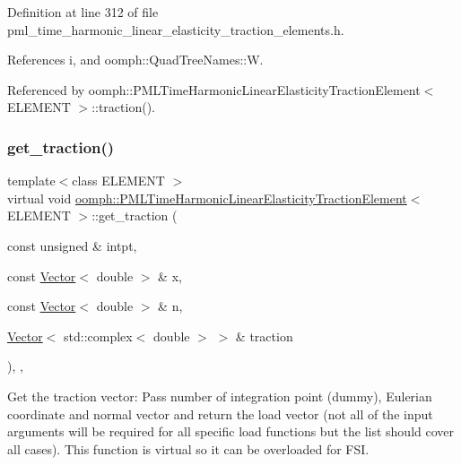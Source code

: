 Definition at line 312 of file pml\+\_\+time\+\_\+harmonic\+\_\+linear\+\_\+elasticity\+\_\+traction\+\_\+elements.\+h.



References i, and oomph\+::\+Quad\+Tree\+Names\+::W.



Referenced by oomph\+::\+P\+M\+L\+Time\+Harmonic\+Linear\+Elasticity\+Traction\+Element$<$ E\+L\+E\+M\+E\+N\+T $>$\+::traction().

\mbox{\label{classoomph_1_1PMLTimeHarmonicLinearElasticityTractionElement_ac75ee57c1976bc09d5797584c34d2c06}} 
\subsubsection{\texorpdfstring{get\+\_\+traction()}{get\_traction()}}
{\footnotesize\ttfamily template$<$class E\+L\+E\+M\+E\+NT $>$ \\
virtual void \hyperlink{classoomph_1_1PMLTimeHarmonicLinearElasticityTractionElement}{oomph\+::\+P\+M\+L\+Time\+Harmonic\+Linear\+Elasticity\+Traction\+Element}$<$ E\+L\+E\+M\+E\+NT $>$\+::get\+\_\+traction (\begin{DoxyParamCaption}\item[{const unsigned \&}]{intpt,  }\item[{const \hyperlink{classoomph_1_1Vector}{Vector}$<$ double $>$ \&}]{x,  }\item[{const \hyperlink{classoomph_1_1Vector}{Vector}$<$ double $>$ \&}]{n,  }\item[{\hyperlink{classoomph_1_1Vector}{Vector}$<$ std\+::complex$<$ double $>$ $>$ \&}]{traction }\end{DoxyParamCaption})\hspace{0.3cm}{\ttfamily [inline]}, {\ttfamily [protected]}, {\ttfamily [virtual]}}



Get the traction vector\+: Pass number of integration point (dummy), Eulerian coordinate and normal vector and return the load vector (not all of the input arguments will be required for all specific load functions but the list should cover all cases). This function is virtual so it can be overloaded for F\+SI. 




